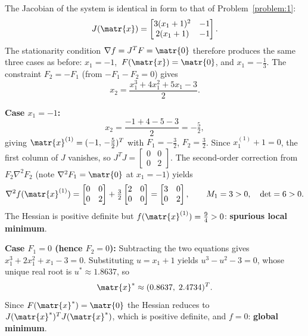 The Jacobian of the system is identical in form to that of
Problem~\ref{problem:1}:
\begin{equation*}
  J(\matr{x}) =
  \begin{bmatrix}
    3(x_1+1)^2 & -1 \\
    2(x_1+1)   & -1
  \end{bmatrix}.
\end{equation*}
The stationarity condition $\nabla f = J^T F = \matr{0}$ therefore produces the
same three cases as before: $x_1 = -1$,\ $F(\matr{x}) = \matr{0}$, and
$x_1 = -\tfrac{1}{3}$.  The constraint $F_2 = -F_1$ (from $-F_1 - F_2 = 0$)
gives
\begin{equation*}
  x_2 = \frac{x_1^3 + 4x_1^2 + 5x_1 - 3}{2}.
\end{equation*}

\medskip
\noindent\textbf{Case $x_1 = -1$:}
\begin{equation*}
  x_2 = \frac{-1+4-5-3}{2} = -\tfrac{5}{2},
\end{equation*}
giving $\matr{x}^{(1)} = (-1,\,-\tfrac{5}{2})^T$ with
$F_1 = -\tfrac{3}{2}$, $F_2 = \tfrac{3}{2}$.
Since $x_1^{(1)}+1 = 0$, the first column of $J$ vanishes, so $J^T J =
\begin{bmatrix}0&0\\0&2\end{bmatrix}$.
The second-order correction from $F_2\nabla^2 F_2$ (note $\nabla^2 F_1 = \matr{0}$
at $x_1 = -1$) yields
\begin{equation*}
  \nabla^2 f(\matr{x}^{(1)}) =
  \begin{bmatrix}0&0\\0&2\end{bmatrix}
  + \tfrac{3}{2}\begin{bmatrix}2&0\\0&0\end{bmatrix}
  = \begin{bmatrix}3&0\\0&2\end{bmatrix},
  \qquad M_1 = 3>0,\quad \det = 6>0.
\end{equation*}
The Hessian is positive definite but $f(\matr{x}^{(1)}) = \tfrac{9}{4} > 0$:
\textbf{spurious local minimum}.

\medskip
\noindent\textbf{Case $F_1 = 0$ (hence $F_2 = 0$):}
Subtracting the two equations gives $x_1^3 + 2x_1^2 + x_1 - 3 = 0$.
Substituting $u = x_1 + 1$ yields $u^3 - u^2 - 3 = 0$, whose unique real root
is $u^* \approx 1.8637$, so
\begin{equation*}
  \matr{x}^* \approx (0.8637,\;2.4734)^T.
\end{equation*}
Since $F(\matr{x}^*) = \matr{0}$ the Hessian reduces to $J(\matr{x}^*)^T J(\matr{x}^*)$,
which is positive definite, and $f = 0$: \textbf{global minimum}.

